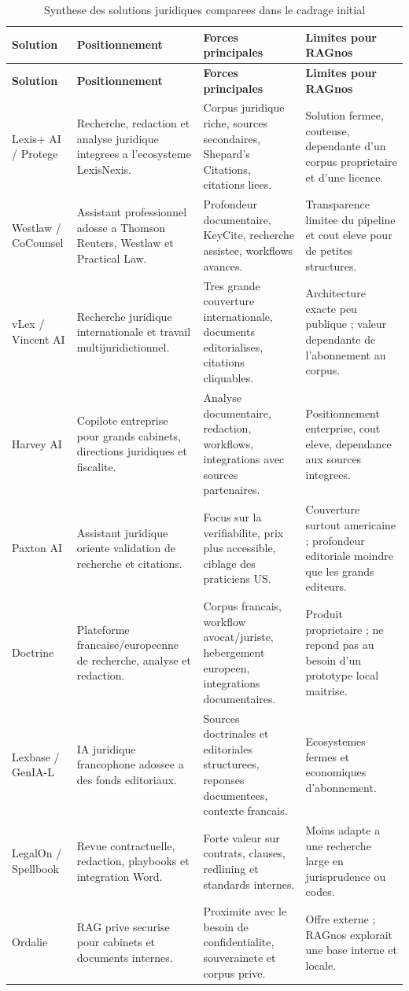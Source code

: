 \documentclass[11pt,a4paper]{article}
\begin{document}
\begin{longtable}{p{3.1cm}p{4.2cm}p{4.5cm}p{3.2cm}}
\caption{Synthese des solutions juridiques comparees dans le cadrage initial}\\
\toprule
\textbf{Solution} & \textbf{Positionnement} & \textbf{Forces principales} & \textbf{Limites pour RAGnos}\\
\midrule
\endfirsthead
\toprule
\textbf{Solution} & \textbf{Positionnement} & \textbf{Forces principales} & \textbf{Limites pour RAGnos}\\
\midrule
\endhead
Lexis+ AI / Protege & Recherche, redaction et analyse juridique integrees a l'ecosysteme LexisNexis. & Corpus juridique riche, sources secondaires, Shepard's Citations, citations liees. & Solution fermee, couteuse, dependante d'un corpus proprietaire et d'une licence. \\
Westlaw / CoCounsel & Assistant professionnel adosse a Thomson Reuters, Westlaw et Practical Law. & Profondeur documentaire, KeyCite, recherche assistee, workflows avances. & Transparence limitee du pipeline et cout eleve pour de petites structures. \\
vLex / Vincent AI & Recherche juridique internationale et travail multijuridictionnel. & Tres grande couverture internationale, documents editorialises, citations cliquables. & Architecture exacte peu publique ; valeur dependante de l'abonnement au corpus. \\
Harvey AI & Copilote entreprise pour grands cabinets, directions juridiques et fiscalite. & Analyse documentaire, redaction, workflows, integrations avec sources partenaires. & Positionnement enterprise, cout eleve, dependance aux sources integrees. \\
Paxton AI & Assistant juridique oriente validation de recherche et citations. & Focus sur la verifiabilite, prix plus accessible, ciblage des praticiens US. & Couverture surtout americaine ; profondeur editoriale moindre que les grands editeurs. \\
Doctrine & Plateforme francaise/europeenne de recherche, analyse et redaction. & Corpus francais, workflow avocat/juriste, hebergement europeen, integrations documentaires. & Produit proprietaire ; ne repond pas au besoin d'un prototype local maitrise. \\
Lexbase / GenIA-L & IA juridique francophone adossee a des fonds editoriaux. & Sources doctrinales et editoriales structurees, reponses documentees, contexte francais. & Ecosystemes fermes et economiques d'abonnement. \\
LegalOn / Spellbook & Revue contractuelle, redaction, playbooks et integration Word. & Forte valeur sur contrats, clauses, redlining et standards internes. & Moins adapte a une recherche large en jurisprudence ou codes. \\
Ordalie & RAG prive securise pour cabinets et documents internes. & Proximite avec le besoin de confidentialite, souverainete et corpus prive. & Offre externe ; RAGnos explorait une base interne et locale. \\
\bottomrule
\end{longtable}
\end{document}
